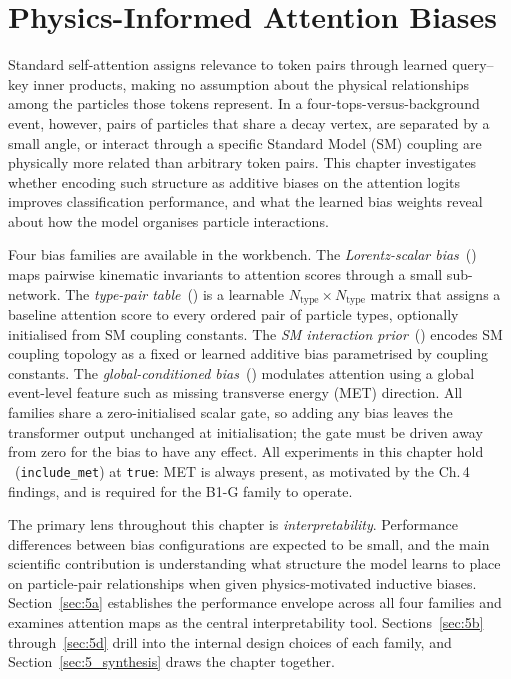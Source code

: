 \chapter{Physics-Informed Attention Biases}
\label{ch:biases}

Standard self-attention assigns relevance to token pairs through learned
query--key inner products, making no assumption about the physical
relationships among the particles those tokens represent. In a
four-tops-versus-background event, however, pairs of particles that share
a decay vertex, are separated by a small angle, or interact through a
specific Standard Model (SM) coupling are physically more related than
arbitrary token pairs. This chapter investigates whether encoding such
structure as additive biases on the attention logits improves
classification performance, and what the learned bias weights reveal about
how the model organises particle interactions.

Four bias families are available in the workbench. The
\textit{Lorentz-scalar bias}~() maps pairwise kinematic
invariants to attention scores through a small sub-network. The
\textit{type-pair table}~() is a learnable
$N_\mathrm{type}\times N_\mathrm{type}$ matrix that assigns a baseline
attention score to every ordered pair of particle types, optionally
initialised from SM coupling constants. The \textit{SM interaction
prior}~() encodes SM coupling topology as a fixed or
learned additive bias parametrised by coupling constants. The
\textit{global-conditioned bias}~() modulates attention
using a global event-level feature such as missing transverse energy (MET)
direction. All families share a zero-initialised scalar gate, so adding
any bias leaves the transformer output unchanged at initialisation;
the gate must be driven away from zero for the bias to have any effect.
All experiments in this chapter hold ~(\texttt{include\_met})
at \texttt{true}: MET is always present, as motivated by the Ch.\,4
findings, and is required for the B1-G family to operate.

The primary lens throughout this chapter is \textit{interpretability}.
Performance differences between bias configurations are expected to be
small, and the main scientific contribution is understanding what structure
the model learns to place on particle-pair relationships when given
physics-motivated inductive biases. Section~\ref{sec:5a} establishes the
performance envelope across all four families and examines attention maps
as the central interpretability tool. Sections~\ref{sec:5b}
through~\ref{sec:5d} drill into the internal design choices of each
family, and Section~\ref{sec:5_synthesis} draws the chapter together.


